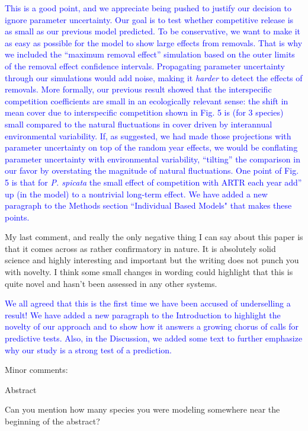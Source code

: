 \documentclass[12pt]{article}
\newcommand{\response}{\textcolor{blue}}
\begin{document}
\response{This is a good point, and we appreciate being pushed to justify our decision to ignore parameter uncertainty. Our goal is to test
whether competitive release is as small as our previous model predicted. To be conservative, we want to make it as easy as possible for the model to show 
large effects from removals. That is why we included the ``maximum removal effect'' simulation based on the outer limits of the removal effect
confidence intervals. Propagating parameter uncertainty through our simulations would add noise, making it \emph{harder} to 
detect the effects of removals. More formally, our previous result showed that the interspecific competition coefficients are small in an ecologically
relevant sense: the shift in mean cover due to interspecific competition shown in Fig. 5 is (for 3 species) small compared to the natural fluctuations in cover driven by interannual environmental variability. If, as suggested, we had made those projections with parameter uncertainty on top of the random year effects, 
we would be conflating parameter uncertainty with environmental variability, ``tilting'' the comparison in our favor by overstating the magnitude 
of natural fluctuations. One point of Fig. 5 is that for \emph{P. spicata} the small effect of competition with ARTR each year add'' 
up (in the model) to a nontrivial long-term effect. We have added a new paragraph to the Methods section ``Individual Based Models" that makes these points. }

 
My last comment, and really the only negative thing I can say about this paper is that it comes across as rather confirmatory in nature. It is absolutely solid science and 
highly interesting and important but the writing does not punch you with novelty. I think some small changes in wording could highlight that this is quite novel and hasn't 
been assessed in any other systems. 

\response{We all agreed that this is the first time we have been accused of underselling a result! We have added a new paragraph to the Introduction
to highlight the novelty of our approach and to show how it answers a growing chorus of calls for predictive tests. Also, in the Discussion, we 
added some text to further emphasize why our study is a strong test of a prediction. }

Minor comments:

Abstract

Can you mention how many species you were modeling somewhere near the beginning of the abstract?
\end{document}
